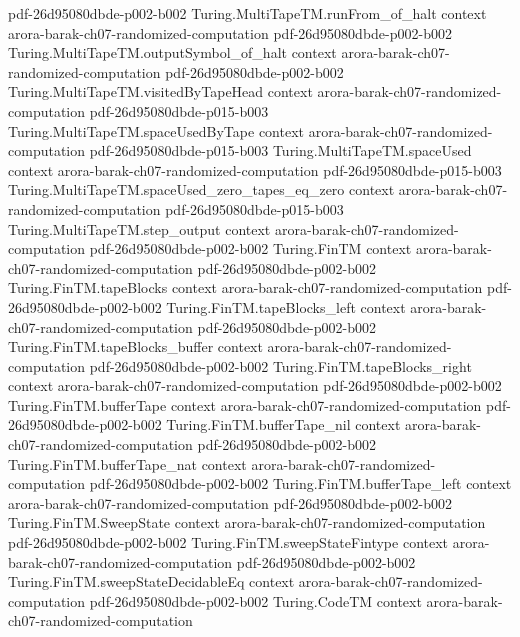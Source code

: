 \begin{theorem}
  {pdf-26d95080dbde-p002-b002}
\proofstep
  {Turing.MultiTapeTM.runFrom_of_halt}
  {context}
  {arora-barak-ch07-randomized-computation}
  {pdf-26d95080dbde-p002-b002}
\proofstep
  {Turing.MultiTapeTM.outputSymbol_of_halt}
  {context}
  {arora-barak-ch07-randomized-computation}
  {pdf-26d95080dbde-p002-b002}
\proofstep
  {Turing.MultiTapeTM.visitedByTapeHead}
  {context}
  {arora-barak-ch07-randomized-computation}
  {pdf-26d95080dbde-p015-b003}
\proofstep
  {Turing.MultiTapeTM.spaceUsedByTape}
  {context}
  {arora-barak-ch07-randomized-computation}
  {pdf-26d95080dbde-p015-b003}
\proofstep
  {Turing.MultiTapeTM.spaceUsed}
  {context}
  {arora-barak-ch07-randomized-computation}
  {pdf-26d95080dbde-p015-b003}
\proofstep
  {Turing.MultiTapeTM.spaceUsed_zero_tapes_eq_zero}
  {context}
  {arora-barak-ch07-randomized-computation}
  {pdf-26d95080dbde-p015-b003}
\proofstep
  {Turing.MultiTapeTM.step_output}
  {context}
  {arora-barak-ch07-randomized-computation}
  {pdf-26d95080dbde-p002-b002}
\proofstep
  {Turing.FinTM}
  {context}
  {arora-barak-ch07-randomized-computation}
  {pdf-26d95080dbde-p002-b002}
\proofstep
  {Turing.FinTM.tapeBlocks}
  {context}
  {arora-barak-ch07-randomized-computation}
  {pdf-26d95080dbde-p002-b002}
\proofstep
  {Turing.FinTM.tapeBlocks_left}
  {context}
  {arora-barak-ch07-randomized-computation}
  {pdf-26d95080dbde-p002-b002}
\proofstep
  {Turing.FinTM.tapeBlocks_buffer}
  {context}
  {arora-barak-ch07-randomized-computation}
  {pdf-26d95080dbde-p002-b002}
\proofstep
  {Turing.FinTM.tapeBlocks_right}
  {context}
  {arora-barak-ch07-randomized-computation}
  {pdf-26d95080dbde-p002-b002}
\proofstep
  {Turing.FinTM.bufferTape}
  {context}
  {arora-barak-ch07-randomized-computation}
  {pdf-26d95080dbde-p002-b002}
\proofstep
  {Turing.FinTM.bufferTape_nil}
  {context}
  {arora-barak-ch07-randomized-computation}
  {pdf-26d95080dbde-p002-b002}
\proofstep
  {Turing.FinTM.bufferTape_nat}
  {context}
  {arora-barak-ch07-randomized-computation}
  {pdf-26d95080dbde-p002-b002}
\proofstep
  {Turing.FinTM.bufferTape_left}
  {context}
  {arora-barak-ch07-randomized-computation}
  {pdf-26d95080dbde-p002-b002}
\proofstep
  {Turing.FinTM.SweepState}
  {context}
  {arora-barak-ch07-randomized-computation}
  {pdf-26d95080dbde-p002-b002}
\proofstep
  {Turing.FinTM.sweepStateFintype}
  {context}
  {arora-barak-ch07-randomized-computation}
  {pdf-26d95080dbde-p002-b002}
\proofstep
  {Turing.FinTM.sweepStateDecidableEq}
  {context}
  {arora-barak-ch07-randomized-computation}
  {pdf-26d95080dbde-p002-b002}
\proofstep
  {Turing.CodeTM}
  {context}
  {arora-barak-ch07-randomized-computation}

\end{theorem}
